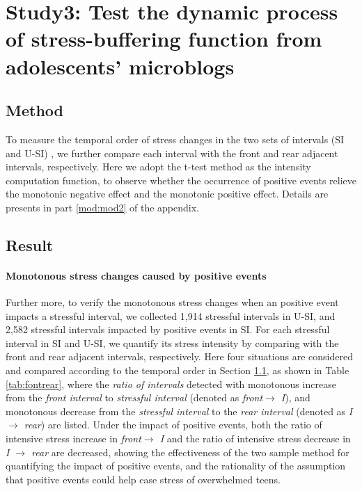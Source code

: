 \section{Study3: Test the dynamic process of stress-buffering function from adolescents' microblogs}
\subsection{Method}
\label{sec:temporal}
To measure the temporal order of stress changes in the two sets of intervals (SI and U-SI) ,
we further compare each interval with the front and rear adjacent intervals, respectively.
Here we adopt the t-test method as the intensity computation function,
to observe whether the occurrence of positive events relieve the monotonic negative effect and the monotonic positive effect.
Details are presents in part \ref{mod:mod2} of the appendix.

\subsection{Result}
\paragraph{Monotonous stress changes caused by positive events}
Further more,
to verify the monotonous stress changes when an positive event impacts a stressful interval,
we collected 1,914 stressful intervals in U-SI,
and 2,582 stressful intervals impacted by positive events in SI.
For each stressful interval in SI and U-SI,
we quantify its stress intensity by comparing with the front and rear adjacent intervals, respectively.
Here four situations are considered and compared according to the temporal order in Section \ref{sec:temporal},
as shown in Table \ref{tab:fontrear},
where the \emph{ratio of intervals} detected with monotonous increase from the \emph{front interval} to \emph{stressful interval} (denoted as \emph{front$ \rightarrow$ I}),
and monotonous decrease from the \emph{stressful interval} to the \emph{rear interval} (denoted as \emph{I $\rightarrow$ rear}) are listed.
Under the impact of positive events,
both the ratio of intensive stress increase in \emph{front$ \rightarrow$ I}
and the ratio of intensive stress decrease in \emph{I $\rightarrow$ rear} are decreased,
showing the effectiveness of the two sample method for quantifying the impact of positive events,
and the rationality of the assumption that positive events could help ease stress of overwhelmed teens.

